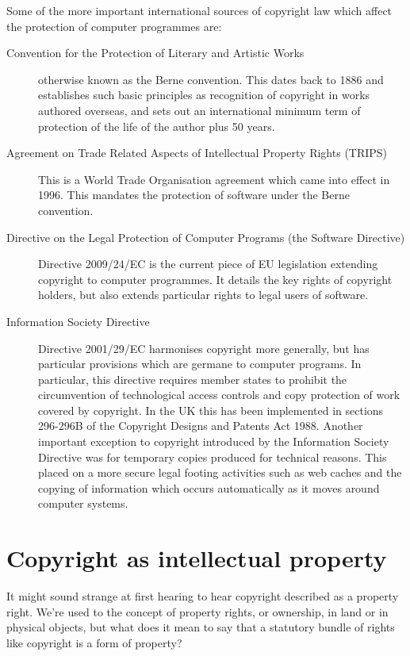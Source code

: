 \documentclass[a4paper,12pt]{article}
\begin{document}
Some of the more important international sources of copyright law which
affect the protection of computer programmes are:
\begin{description}
  \item[Convention for the Protection of Literary and Artistic Works]
    otherwise known as the Berne convention. This dates back to 1886 and
    establishes such basic principles as recognition of copyright in works
    authored overseas, and sets out an international minimum term of
    protection of the life of the author plus 50 years.
  \item[Agreement on Trade Related Aspects of Intellectual Property Rights
    (TRIPS)] This is a World Trade Organisation agreement which came into
    effect in 1996. This mandates the protection of software under the Berne
    convention. 
  \item[Directive on the Legal Protection of Computer Programs (the Software
    Directive)] Directive
    2009/24/EC  is the current piece of EU legislation
    extending copyright to computer programmes. It details the key rights of
    copyright holders, but also extends particular rights to legal users of
    software.
  \item[Information Society Directive] Directive 2001/29/EC harmonises 
    copyright more generally, but has particular provisions which are
    germane to computer programs. In particular, this directive requires
    member states to prohibit the circumvention of technological access
    controls and copy protection of work covered by copyright. In the UK
    this has been implemented in sections 296-296B of the Copyright Designs
    and Patents Act 1988. Another important exception to copyright
    introduced by the Information Society Directive was for temporary copies
    produced for technical reasons. This placed on a more secure legal
    footing activities such as web caches and the copying of information
    which occurs automatically as it moves around computer systems.
\end{description}

\section{Copyright as intellectual property}

It might sound strange at first hearing to hear copyright described as a
property right. We're used to the concept of property rights, or ownership,
in land or in physical objects, but what does it mean to say that a
statutory bundle of rights like copyright is a form of property? 
\end{document}
